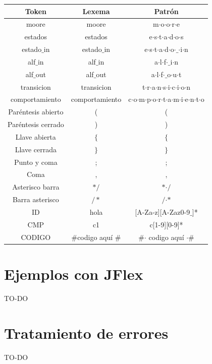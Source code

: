 	\begin{center}
	\begin{tabular}{|c|c|c|}
		\hline 
		\textbf{Token} & \textbf{Lexema} & \textbf{Patrón} \\ 
		\hline 
		moore & moore & m$\cdot$o$\cdot$o$\cdot$r$\cdot$e  \\ 
		\hline 
		estados &estados & e$\cdot$s$\cdot$t$\cdot$a$\cdot$d$\cdot$o$\cdot$s \\ 
		\hline 
		estado$\_$in & estado$\_$in & e$\cdot$s$\cdot$t$\cdot$a$\cdot$d$\cdot$o$\cdot$$\_$$\cdot$i$\cdot$n \\ 
		\hline 
		alf$\_$in	& alf$\_$in & a$\cdot$l$\cdot$f$\cdot$$\_$i$\cdot$n \\ 
		\hline 
		alf$\_$out	& alf$\_$out & a$\cdot$l$\cdot$f$\cdot$$\_$o$\cdot$u$\cdot$t \\ 
		\hline 
		transicion	& transicion & t$\cdot$r$\cdot$a$\cdot$n$\cdot$s$\cdot$i$\cdot$c$\cdot$i$\cdot$o$\cdot$n \\ 
		\hline 
		comportamiento	& comportamiento & c$\cdot$o$\cdot$m$\cdot$p$\cdot$o$\cdot$r$\cdot$t$\cdot$a$\cdot$m$\cdot$i$\cdot$e$\cdot$n$\cdot$t$\cdot$o \\ 
		\hline 
		Paréntesis abierto	& ( & ( \\ 
		\hline 
		Paréntesis cerrado	& ) & ) \\ 
		\hline 
		Llave abierta	& $\{$ & $\{$ \\ 
		\hline 
		Llave cerrada	& $\}$ & $\}$ \\ 
		\hline 
		Punto y coma	& ; & ; \\ 
		\hline 
		Coma	& , &  , \\ 
		\hline
		Asterisco barra & $\ast/$  & $\ast$$\cdot/$ \\ 
		\hline 
		Barra asterisco & $/\ast$  &  $/$$\cdot$$\ast$ \\ 
		\hline  
		ID	& hola  & [A-Za-z][A-Zaz0-9$\_$]* \\ 
		\hline 
		CMP	& c1 & c[1-9][0-9]* \\ 
		\hline
		CODIGO	& $\#$codigo aquí $\#$  & $\#$$\cdot$ codigo aquí $\cdot$$\#$\\ 
		\hline
		
		
		
	\end{tabular} 	
\end{center}

\section{Ejemplos con JFlex}

TO-DO

\section{Tratamiento de errores}

TO-DO






